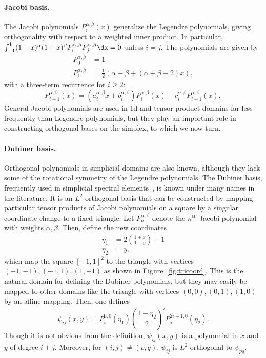 \paragraph{Jacobi basis.}
The Jacobi polynomials $P^{\alpha,\beta}_i(x)$ generalize the Legendre
polynomials, giving orthogonality with respect to a weighted inner
product.  In particular, $\int_{-1}^1 (1-x)^\alpha (1+x)^\beta
P^{\alpha,\beta}_i P^{\alpha,\beta}_j \dx = 0$ unless $i=j$.
The polynomials are given by
\begin{equation}
\label{eq:firsttwojacobi}
\begin{split}
P_0^{\alpha,\beta} & = 1 \\
P_1^{\alpha,\beta} &
= \frac{1}{2}\left( \alpha - \beta + \left( \alpha + \beta + 2 \right)
x \right),
\end{split}
\end{equation}
with a three-term recurrence for $i\geqslant2$:
\begin{equation}
\label{eq:recur}
P_{i+1}^{\alpha,\beta}(x)
= (a^{\alpha,\beta}_i x + b^{\alpha,\beta}_i) P_i^{\alpha,\beta}(x) - c^{\alpha,\beta}_i P_{i-1}^{\alpha,\beta}(x),
\end{equation}
General Jacobi polynomials are used in 1d and tensor-product domains far
less frequently than Legendre polynomials, but they play an important role
in constructing orthogonal bases on the simplex, to which we now turn.


\paragraph{Dubiner basis.}
Orthogonal polynomials in simplicial domains are also known,
although they lack some of the rotational symmetry of the Legendre
polynomials.  The Dubiner basis, frequently used in simplicial spectral
elements~\citep{Dubiner1991}, is known under many names in the literature.
It is an $L^2$-orthogonal basis that can be constructed by mapping
particular tensor products of Jacobi polynomials on a square by a singular
coordinate change to a fixed triangle.  Let $P^{\alpha,\beta}_n$
denote the $n^\mathrm{th}$ Jacobi polynomial with weights $\alpha,
\beta$.  Then, define the new coordinates
\begin{equation}
\label{eq:dubcoord}
\begin{split}
\eta_1 & = 2\left(\frac{1+x}{1-y}\right)-1 \\
\eta_2 & = y,
\end{split}
\end{equation}
which map the square $[-1,1]^2$ to the triangle with vertices
$(-1,-1),(-1,1),(1,-1)$ as shown in Figure~\ref{fig:tricoord}.  This is
the natural domain for defining the Dubiner polynomials, but they may
easily be mapped to other domains like the triangle with vertices
$(0,0) , (0,1) , (1,0)$ by an affine mapping.
Then, one defines
\begin{equation}
\psi_{ij}(x,y) = P_i^{0,0}(\eta_1) \left( \frac{1-\eta_2}{2}
\right)^i P_j^{2i+1,0}(\eta_2).
\end{equation}
Though it is not obvious from the definition, $\psi_{ij}(x,y)$ is
a polynomial in $x$ and $y$ of degree $i + j$.  Moreover,
for $(i,j) \neq (p,q)$, $\psi_{ij}$ is $L^2$-orthogonal to
$\psi_{pq}$.

